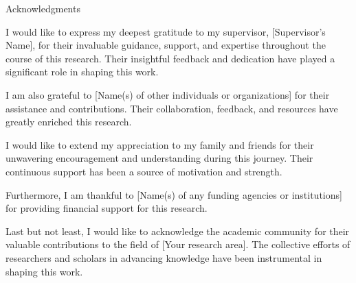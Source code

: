 \thispagestyle{empty}

\vspace*{20mm}

\begin{center}
    { Acknowledgments}
\end{center}

\vspace{10mm}

I would like to express my deepest gratitude to my supervisor, [Supervisor's Name], for their invaluable guidance, support, and expertise throughout the course of this research. Their insightful feedback and dedication have played a significant role in shaping this work.

I am also grateful to [Name(s) of other individuals or organizations] for their assistance and contributions. Their collaboration, feedback, and resources have greatly enriched this research.

I would like to extend my appreciation to my family and friends for their unwavering encouragement and understanding during this journey. Their continuous support has been a source of motivation and strength.

Furthermore, I am thankful to [Name(s) of any funding agencies or institutions] for providing financial support for this research.

Last but not least, I would like to acknowledge the academic community for their valuable contributions to the field of [Your research area]. The collective efforts of researchers and scholars in advancing knowledge have been instrumental in shaping this work.

\vspace{10mm}

\cleardoublepage{}


